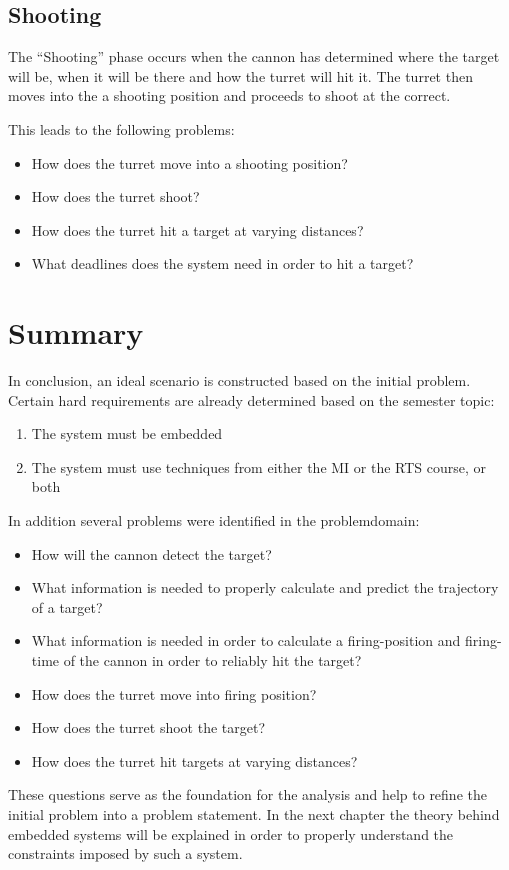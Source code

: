 \subsection{Shooting}
The ``Shooting'' phase occurs when the cannon has determined where the target
will be, when it will be there and how the turret will hit it. The turret then moves
into the a shooting position and proceeds to shoot at the correct.\nl

This leads to the following problems:
\begin{itemize}
  \item How does the turret move into a shooting position?
  \item How does the turret shoot?
  \item How does the turret hit a target at varying distances?
  \item What deadlines does the system need in order to hit a target?
\end{itemize}

\section{Summary}
In conclusion, an ideal scenario is constructed based on the initial problem.
Certain hard requirements are already determined based on the semester
topic:
\begin{enumerate}
	\item The system must be embedded
	\item The system must use techniques from either the MI or the RTS course, or both
\end{enumerate}

In addition several problems were identified in the problemdomain:
\begin{itemize}
	\item How will the cannon detect the target?
	\item What information is needed to properly calculate and predict the
	trajectory of a target?
	\item What information is needed in order to calculate a firing-position and
	firing-time of the cannon in order to reliably hit the target?
	\item How does the turret move into firing position?
	\item How does the turret shoot the target?
	\item How does the turret hit targets at varying distances?
\end{itemize}

These questions serve as the foundation for the analysis and help to
refine the initial problem into a problem statement. In the next chapter the
theory behind embedded systems will be explained in order to properly
understand the constraints imposed by such a system.
